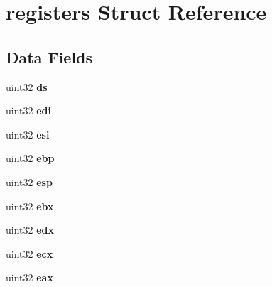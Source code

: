 \hypertarget{structregisters}{
\section{registers Struct Reference}
\label{structregisters}
}
\subsection*{Data Fields}
\begin{DoxyCompactItemize}
\item 
\hypertarget{structregisters_a5bca43779caa99b6546c67c92fa96795}{
uint32 {\bfseries ds}}
\label{structregisters_a5bca43779caa99b6546c67c92fa96795}

\item 
\hypertarget{structregisters_a21389bd4fcf274118c6adf12a24c9889}{
uint32 {\bfseries edi}}
\label{structregisters_a21389bd4fcf274118c6adf12a24c9889}

\item 
\hypertarget{structregisters_a6adf8439e8b2f6dfbd9f3a687ccf4d14}{
uint32 {\bfseries esi}}
\label{structregisters_a6adf8439e8b2f6dfbd9f3a687ccf4d14}

\item 
\hypertarget{structregisters_a35adc6b8d5597dfee367ff90f615c948}{
uint32 {\bfseries ebp}}
\label{structregisters_a35adc6b8d5597dfee367ff90f615c948}

\item 
\hypertarget{structregisters_aed2ad213a3e6d7cd3c5b922f1ad2d022}{
uint32 {\bfseries esp}}
\label{structregisters_aed2ad213a3e6d7cd3c5b922f1ad2d022}

\item 
\hypertarget{structregisters_a267e7e19e0c7d75c747b6b44d7420896}{
uint32 {\bfseries ebx}}
\label{structregisters_a267e7e19e0c7d75c747b6b44d7420896}

\item 
\hypertarget{structregisters_a3fe3dcfbcff14bf929883527112338d2}{
uint32 {\bfseries edx}}
\label{structregisters_a3fe3dcfbcff14bf929883527112338d2}

\item 
\hypertarget{structregisters_a5b930ca144576e0937f838c546d8d015}{
uint32 {\bfseries ecx}}
\label{structregisters_a5b930ca144576e0937f838c546d8d015}

\item 
\hypertarget{structregisters_ae646012d16da46b9b898a1857a176328}{
uint32 {\bfseries eax}}
\label{structregisters_ae646012d16da46b9b898a1857a176328}


\end{DoxyCompactItemize}
